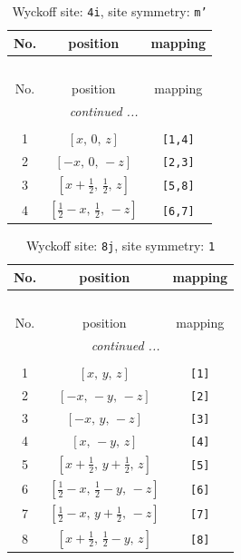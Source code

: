 \documentclass[fleqn,8pt]{jsarticle}
\begin{document}
\renewcommand{\arraystretch}{1.2}
\begin{longtable}{ccc}
\caption{Wyckoff site: {\tt 4i}, site symmetry: {\tt m'}}
 \\
 \hline \hline
No. & position & mapping \\ \hline \endfirsthead

\multicolumn{2}{l}{\tablename\ \thetable{}} \\
 \hline \hline
No. & position & mapping \\ \hline \endhead

 \hline \hline
\multicolumn{2}{r}{\footnotesize\it continued ...} \\ \endfoot

 \hline \hline
\multicolumn{2}{r}{} \\ \endlastfoot

1 & $\left[ x,\, 0,\, z \right]$ & {\tt [1,4]} \\ \hline
2 & $\left[ - x,\, 0,\, - z \right]$ & {\tt [2,3]} \\ \hline
3 & $\left[ x + \frac{1}{2},\, \frac{1}{2},\, z \right]$ & {\tt [5,8]} \\ \hline
4 & $\left[ \frac{1}{2} - x,\, \frac{1}{2},\, - z \right]$ & {\tt [6,7]} \\
\end{longtable}
\renewcommand{\arraystretch}{1.2}
\begin{longtable}{ccc}
\caption{Wyckoff site: {\tt 8j}, site symmetry: {\tt 1}}
 \\
 \hline \hline
No. & position & mapping \\ \hline \endfirsthead

\multicolumn{2}{l}{\tablename\ \thetable{}} \\
 \hline \hline
No. & position & mapping \\ \hline \endhead

 \hline \hline
\multicolumn{2}{r}{\footnotesize\it continued ...} \\ \endfoot

 \hline \hline
\multicolumn{2}{r}{} \\ \endlastfoot

1 & $\left[ x,\, y,\, z \right]$ & {\tt [1]} \\ \hline
2 & $\left[ - x,\, - y,\, - z \right]$ & {\tt [2]} \\ \hline
3 & $\left[ - x,\, y,\, - z \right]$ & {\tt [3]} \\ \hline
4 & $\left[ x,\, - y,\, z \right]$ & {\tt [4]} \\ \hline
5 & $\left[ x + \frac{1}{2},\, y + \frac{1}{2},\, z \right]$ & {\tt [5]} \\ \hline
6 & $\left[ \frac{1}{2} - x,\, \frac{1}{2} - y,\, - z \right]$ & {\tt [6]} \\ \hline
7 & $\left[ \frac{1}{2} - x,\, y + \frac{1}{2},\, - z \right]$ & {\tt [7]} \\ \hline
8 & $\left[ x + \frac{1}{2},\, \frac{1}{2} - y,\, z \right]$ & {\tt [8]} \\
\end{longtable}
\end{document}
